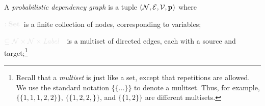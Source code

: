\documentclass{article}
\newcommand{\notation}[2][]{#1}
\renewcommand{\notation}[2][]{{\color{notationcolor} #2}}
\newcommand\Set{\textbf{Set}}
\newcommand{\V}{\mathcal V}
\newcommand{\N}{\mathcal N}
\newcommand{\Ed}{\mathcal E}
\newcommand{\modelname}{probabilistic dependency graph}
\newcommand{\MN}{PDG}
\numberwithin{equation}{section}
\begin{document}
	\def\mnvars[#1]{(\N#1, \Ed#1, \V#1, \mat p#1)}
	\begin{defn}[\MN]\label{def:model}
		A \emph{\modelname} is a tuple $\mnvars[]$ where
		\begin{description}[nosep]
			\item[$\N$] $\notation{:\Set}$~is a finite
                          collection of nodes, corresponding to
variables; 
			
			\item[$\Ed$] $\notation{\subseteq \N \times \N
                          \times \mathit{Label}}$~~is a multiset of
                          directed edges, each with a source and
target;\footnote{Recall that a \emph{multiset} is just like a set,
  except that repetitions are allowed.  We use the standard notation
  $\{\{ \ldots \}\}$ to denote a mulitset.  Thus, for example,
  $\{\{1,1,1,2,2\}\}$, $\{\{1,2,2,\}\}$, and $\{\{1,2\}\}$ are
  different multisets.}

\end{description}
\end{defn}
\end{document}
